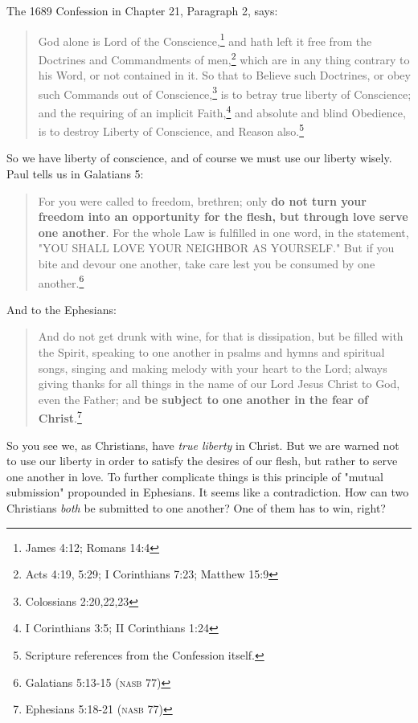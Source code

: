 The 1689 Confession in Chapter 21, Paragraph 2, says:
\begin{quote}
God alone is Lord of the Conscience,\footnote{James 4:12; Romans 14:4} and hath left it free from the Doctrines and Commandments of men,\footnote{Acts 4:19, 5:29; I Corinthians 7:23; Matthew 15:9} which are in any thing contrary to his Word, or not contained in it. So that to Believe such Doctrines, or obey such Commands out of Conscience,\footnote{Colossians 2:20,22,23} is to betray true liberty of Conscience; and the requiring of an implicit Faith,\footnote{I Corinthians 3:5; II Corinthians 1:24} and absolute and blind Obedience, is to destroy Liberty of Conscience, and Reason also.\footnote{Scripture references from the Confession itself.}
\end{quote}

\noindent
So we have liberty of conscience, and of course we must use our liberty wisely.  Paul tells us in Galatians 5:
\begin{quote}
For you were called to freedom, brethren; only \textbf{do not turn your freedom into an opportunity for the flesh, but through love serve one another}. For the whole Law is fulfilled in one word, in the statement, "YOU SHALL LOVE YOUR NEIGHBOR AS YOURSELF." But if you bite and devour one another, take care lest you be consumed by one another.\footnote{Galatians 5:13-15 \textsc{(nasb 77)}}
\end{quote}

\noindent
And to the Ephesians:
\begin{quote}
And do not get drunk with wine, for that is dissipation, but be filled with the Spirit, speaking to one another in psalms and hymns and spiritual songs, singing and making melody with your heart to the Lord; always giving thanks for all things in the name of our Lord Jesus Christ to God, even the Father; and \textbf{be subject to one another in the fear of Christ}.\footnote{Ephesians 5:18-21 \textsc{(nasb 77)}} 
\end{quote}

\noindent
So you see we, as Christians, have \textit{true liberty} in Christ.  But we are warned not to use our liberty in order to satisfy the desires of our flesh, but rather to serve one another in love.  To further complicate things is this principle of "mutual submission" propounded in Ephesians.  It seems like a contradiction.  How can two Christians \textit{both} be submitted to one another?  One of them has to win, right?  

